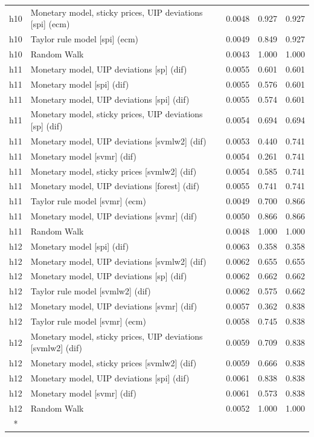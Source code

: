 \begin{ThreePartTable}
\begin{longtable}[t]{cp{5.5cm}ccc}
h10 & \raggedright Monetary model, sticky prices, UIP deviations [spi] (ecm) & 0.0048 & 0.927 & 0.927\\
h10 & \raggedright Taylor rule model [spi] (ecm) & 0.0049 & 0.849 & 0.927\\
h10 & \raggedright Random Walk & 0.0043 & 1.000 & 1.000\\
\addlinespace
h11 & \raggedright Monetary model, UIP deviations [sp] (dif) & 0.0055 & 0.601 & 0.601\\
h11 & \raggedright Monetary model [spi] (dif) & 0.0055 & 0.576 & 0.601\\
h11 & \raggedright Monetary model, UIP deviations [spi] (dif) & 0.0055 & 0.574 & 0.601\\
h11 & \raggedright Monetary model, sticky prices, UIP deviations [sp] (dif) & 0.0054 & 0.694 & 0.694\\
h11 & \raggedright Monetary model, UIP deviations [svmlw2] (dif) & 0.0053 & 0.440 & 0.741\\
h11 & \raggedright Monetary model [svmr] (dif) & 0.0054 & 0.261 & 0.741\\
h11 & \raggedright Monetary model, sticky prices [svmlw2] (dif) & 0.0054 & 0.585 & 0.741\\
h11 & \raggedright Monetary model, UIP deviations [forest] (dif) & 0.0055 & 0.741 & 0.741\\
h11 & \raggedright Taylor rule model [svmr] (ecm) & 0.0049 & 0.700 & 0.866\\
h11 & \raggedright Monetary model, UIP deviations [svmr] (dif) & 0.0050 & 0.866 & 0.866\\
h11 & \raggedright Random Walk & 0.0048 & 1.000 & 1.000\\
\addlinespace
h12 & \raggedright Monetary model [spi] (dif) & 0.0063 & 0.358 & 0.358\\
h12 & \raggedright Monetary model, UIP deviations [svmlw2] (dif) & 0.0062 & 0.655 & 0.655\\
h12 & \raggedright Monetary model, UIP deviations [sp] (dif) & 0.0062 & 0.662 & 0.662\\
h12 & \raggedright Taylor rule model [svmlw2] (dif) & 0.0062 & 0.575 & 0.662\\
h12 & \raggedright Monetary model, UIP deviations [svmr] (dif) & 0.0057 & 0.362 & 0.838\\
h12 & \raggedright Taylor rule model [svmr] (ecm) & 0.0058 & 0.745 & 0.838\\
h12 & \raggedright Monetary model, sticky prices, UIP deviations [svmlw2] (dif) & 0.0059 & 0.709 & 0.838\\
h12 & \raggedright Monetary model, sticky prices [svmlw2] (dif) & 0.0059 & 0.666 & 0.838\\
h12 & \raggedright Monetary model, UIP deviations [spi] (dif) & 0.0061 & 0.838 & 0.838\\
h12 & \raggedright Monetary model [svmr] (dif) & 0.0061 & 0.573 & 0.838\\
h12 & \raggedright Random Walk & 0.0052 & 1.000 & 1.000\\*
\end{longtable}
\end{ThreePartTable}
\endgroup{}
